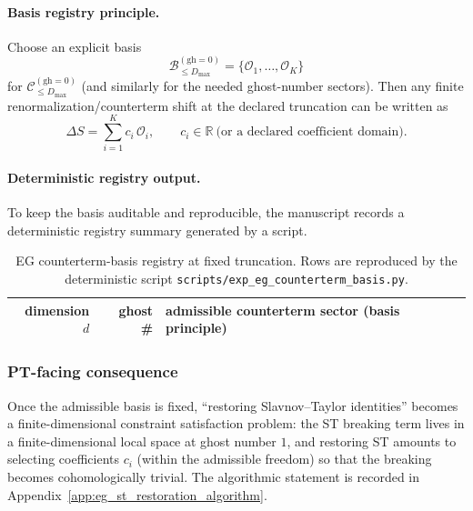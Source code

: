 \paragraph{Basis registry principle.}
\MathTag Choose an explicit basis
\[
\mathcal{B}_{\le D_{\max}}^{(\mathrm{gh}=0)}=\{\mathcal{O}_1,\ldots,\mathcal{O}_K\}
\]
for $\mathcal{C}_{\le D_{\max}}^{(\mathrm{gh}=0)}$ (and similarly for the needed ghost-number sectors).
Then any finite renormalization/counterterm shift at the declared truncation can be written as
\[
\Delta S=\sum_{i=1}^{K} c_i\,\mathcal{O}_i,
\qquad c_i\in\mathbb{R}\ \text{(or a declared coefficient domain).}
\]

\paragraph{Deterministic registry output.}
To keep the basis auditable and reproducible, the manuscript records a deterministic registry summary generated by a script.

\begin{table}[H]
\centering
\small
\setlength{\tabcolsep}{10pt}
\renewcommand{\arraystretch}{1.15}
\begin{tabular}{r r p{9.5cm}}
\toprule
dimension $d$ & ghost \# & admissible counterterm sector (basis principle) \\
\midrule
%
\end{tabular}
\caption{EG counterterm-basis registry at fixed truncation. Rows are reproduced by the deterministic script \texttt{scripts/exp\_eg\_counterterm\_basis.py}.}
\label{tab:eg_counterterm_basis_registry}
\end{table}

\subsubsection{PT-facing consequence}
\AuditTag Once the admissible basis is fixed, ``restoring Slavnov--Taylor identities'' becomes a finite-dimensional constraint satisfaction problem:
the ST breaking term lives in a finite-dimensional local space at ghost number $1$, and restoring ST amounts to selecting coefficients $c_i$ (within the admissible freedom) so that the breaking becomes cohomologically trivial.
The algorithmic statement is recorded in Appendix~\ref{app:eg_st_restoration_algorithm}.

